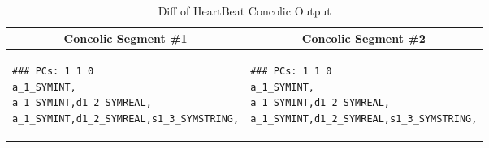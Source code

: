 \noindent
\begin{table}[hb] %
\vspace{-16pt}
\caption{Diff of HeartBeat Concolic Output}
~\label{table:concolicoutputcomparision}
\centering
\begin{tabular}{ p{3.8cm} | p{3.8cm} }
\multicolumn{1}{c}{\textbf{Concolic Segment \#1}} & \multicolumn{1}{c}{\textbf{Concolic Segment \#2}} \\ \hline \hline
\begin{lstlisting}[style=ConcolicOutput]
### PCs: 1 1 0
a_1_SYMINT,
a_1_SYMINT,d1_2_SYMREAL,
a_1_SYMINT,d1_2_SYMREAL,s1_3_SYMSTRING,
\end{lstlisting}
&
\begin{lstlisting}[style=ConcolicOutput]
### PCs: 1 1 0
a_1_SYMINT,
a_1_SYMINT,d1_2_SYMREAL,
a_1_SYMINT,d1_2_SYMREAL,s1_3_SYMSTRING,
\end{lstlisting}

\end{tabular}
\label{fig:exampleoutput}
\vspace{-10pt}
\end{table}

